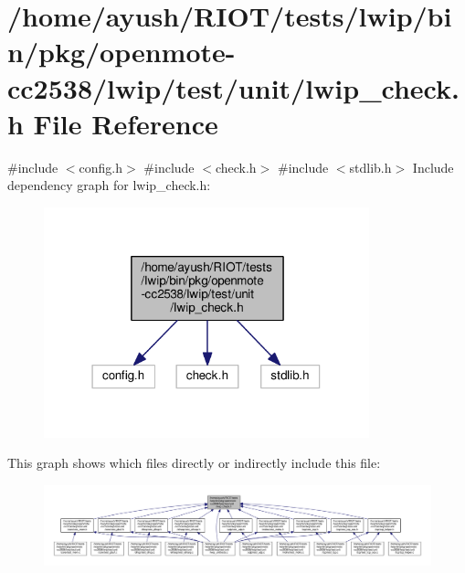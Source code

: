 \hypertarget{openmote-cc2538_2lwip_2test_2unit_2lwip__check_8h}{}\section{/home/ayush/\+R\+I\+O\+T/tests/lwip/bin/pkg/openmote-\/cc2538/lwip/test/unit/lwip\+\_\+check.h File Reference}
\label{openmote-cc2538_2lwip_2test_2unit_2lwip__check_8h}
{\ttfamily \#include $<$config.\+h$>$}\newline
{\ttfamily \#include $<$check.\+h$>$}\newline
{\ttfamily \#include $<$stdlib.\+h$>$}\newline
Include dependency graph for lwip\+\_\+check.\+h\+:
\nopagebreak
\begin{figure}[H]
\begin{center}
\leavevmode
\includegraphics[width=267pt]{openmote-cc2538_2lwip_2test_2unit_2lwip__check_8h__incl}
\end{center}
\end{figure}
This graph shows which files directly or indirectly include this file\+:
\nopagebreak
\begin{figure}[H]
\begin{center}
\leavevmode
\includegraphics[width=350pt]{openmote-cc2538_2lwip_2test_2unit_2lwip__check_8h__dep__incl}
\end{center}
\end{figure}
